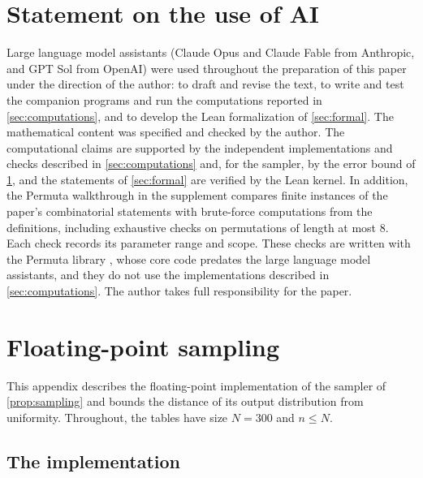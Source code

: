 \documentclass[11pt,reqno]{amsart}
\theoremstyle{definition}
\theoremstyle{remark}
\begin{document}
\section*{Statement on the use of AI}
Large language model assistants (Claude Opus and Claude Fable from
Anthropic, and GPT Sol from OpenAI) were used throughout the preparation of
this paper under the direction of the author: to draft and
revise the text, to write and test the companion programs and run the
computations reported in \cref{sec:computations}, and to develop the Lean
formalization of \cref{sec:formal}.  The mathematical content was specified
and checked by the author.  The computational claims are supported by the
independent implementations and checks described in
\cref{sec:computations} and, for the sampler, by the error bound of
\cref{app:float}, and the statements of \cref{sec:formal} are verified
by the Lean kernel.  In addition, the Permuta walkthrough in the
supplement compares finite instances of the paper's combinatorial statements
with brute-force computations from the definitions, including exhaustive
checks on permutations of length at most $8$.  Each check records its
parameter range and scope.  These checks are written with the Permuta library
\cite{Permuta}, whose core code predates the large language model assistants, and
they do not use the implementations described in \cref{sec:computations}.
The author takes full responsibility for the paper.

\appendix
{}
\section{Floating-point sampling}\label{app:float}

This appendix describes the floating-point implementation of the sampler of
\cref{prop:sampling} and bounds the distance of its output distribution from
uniformity.  Throughout, the tables have size $N=300$ and $n\leq N$.

\subsection{The implementation}\label{app:float-implementation}
\end{document}
